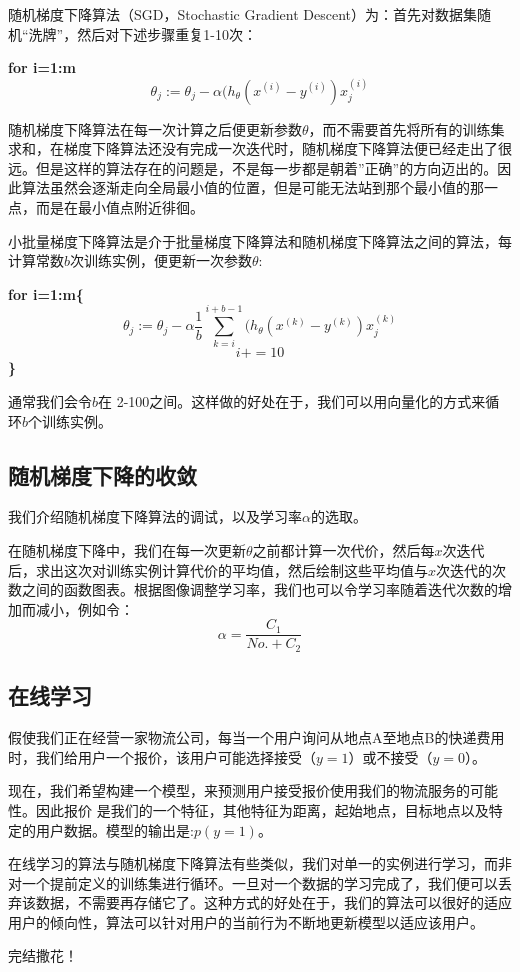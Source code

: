 \documentclass[cn,hazy,blue,normal,14pt]{elegantnote}
\begin{document}
随机梯度下降算法（SGD，Stochastic Gradient Descent）为：首先对数据集随机“洗牌”，然后对下述步骤重复1-10次：

\noindent \textbf{for i=1:m}
$$
\theta_j:=\theta_j-\alpha (h_\theta(x^{(i)}-y^{(i)})x_j^{(i)}
$$

随机梯度下降算法在每一次计算之后便更新参数$\theta$，而不需要首先将所有的训练集求和，在梯度下降算法还没有完成一次迭代时，随机梯度下降算法便已经走出了很远。但是这样的算法存在的问题是，不是每一步都是朝着”正确”的方向迈出的。因此算法虽然会逐渐走向全局最小值的位置，但是可能无法站到那个最小值的那一点，而是在最小值点附近徘徊。

小批量梯度下降算法是介于批量梯度下降算法和随机梯度下降算法之间的算法，每计算常数$b$次训练实例，便更新一次参数$\theta$:

\noindent \textbf{for i=1:m\{}
$$
\theta_j:=\theta_j-\alpha \frac{1}{b}\sum_{k=i}^{i+b-1} (h_\theta(x^{(k)}-y^{(k)})x_j^{(k)}
$$
$$i+=10$$
\textbf{\}}

通常我们会令$b$在 2-100之间。这样做的好处在于，我们可以用向量化的方式来循环$b$个训练实例。
\subsection{随机梯度下降的收敛}
我们介绍随机梯度下降算法的调试，以及学习率$\alpha$的选取。

在随机梯度下降中，我们在每一次更新$\theta$之前都计算一次代价，然后每$x$次迭代后，求出这次对训练实例计算代价的平均值，然后绘制这些平均值与$x$次迭代的次数之间的函数图表。根据图像调整学习率，我们也可以令学习率随着迭代次数的增加而减小，例如令：
$$
\alpha=\frac{C_1}{No.+C_2}
$$
\subsection{在线学习}
假使我们正在经营一家物流公司，每当一个用户询问从地点A至地点B的快递费用时，我们给用户一个报价，该用户可能选择接受（$y=1$）或不接受（$y=0$）。

现在，我们希望构建一个模型，来预测用户接受报价使用我们的物流服务的可能性。因此报价 是我们的一个特征，其他特征为距离，起始地点，目标地点以及特定的用户数据。模型的输出是:$p(y=1)$。

在线学习的算法与随机梯度下降算法有些类似，我们对单一的实例进行学习，而非对一个提前定义的训练集进行循环。一旦对一个数据的学习完成了，我们便可以丢弃该数据，不需要再存储它了。这种方式的好处在于，我们的算法可以很好的适应用户的倾向性，算法可以针对用户的当前行为不断地更新模型以适应该用户。

完结撒花！
\end{document}
